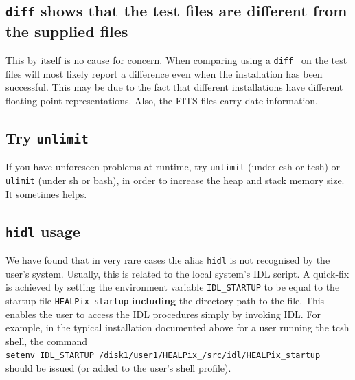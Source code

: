 \documentclass[12pt,twoside]{article}
\begin{document}
\subsection{\texttt{diff} shows that the test files are different from
the supplied files}

This by itself is no cause for concern. When comparing using a
\texttt{diff } on the test files will most likely report a
difference even when the installation has been successful. 
This  may be due to the fact that
different installations  have different floating point
representations. Also, the FITS files carry date information.



\subsection{Try \texttt{unlimit}}

If you have unforeseen problems at runtime, try \texttt{unlimit} (under csh or tcsh) or \texttt{ulimit} (under sh or bash), in order to increase the heap and stack memory size. It
sometimes helps.

\subsection{\texttt{hidl} usage}

We have found that in very rare cases the alias \texttt{hidl}
is not recognised by the user's system. Usually, this is related
to the local system's IDL script. A quick-fix is achieved
by setting the environment variable \texttt{IDL\_STARTUP} to be
equal to the \healpix startup file \texttt{HEALPix\_startup}
{\bf including} the directory path to the file. This enables
the user to access the \healpix IDL procedures simply by invoking
IDL. For example, in the typical installation documented
above for a user running the tcsh shell, the command \hfill \\
\texttt{setenv IDL\_STARTUP
/disk1/user1/HEALPix\_\hpxversion/src/idl/HEALPix\_startup}
\hfill \\
should be issued (or added to the user's shell profile).
\end{document}
